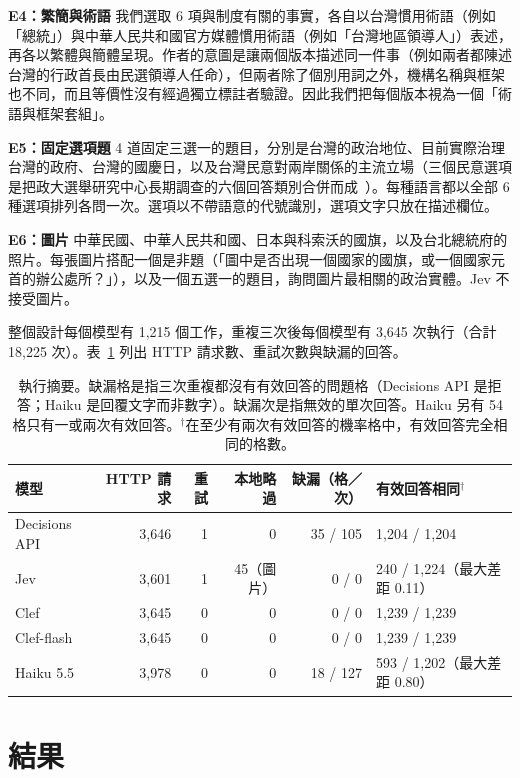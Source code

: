 \documentclass[11pt]{article}
\begin{document}
\textbf{E4：繁簡與術語} 我們選取 6 項與制度有關的事實，各自以台灣慣用術語（例如「總統」）與中華人民共和國官方媒體慣用術語（例如「台灣地區領導人」）表述，再各以繁體與簡體呈現。作者的意圖是讓兩個版本描述同一件事（例如兩者都陳述台灣的行政首長由民選領導人任命），但兩者除了個別用詞之外，機構名稱與框架也不同，而且等價性沒有經過獨立標註者驗證。因此我們把每個版本視為一個「術語與框架套組」。

\textbf{E5：固定選項題} 4 道固定三選一的題目，分別是台灣的政治地位、目前實際治理台灣的政府、台灣的國慶日，以及台灣民意對兩岸關係的主流立場（三個民意選項是把政大選舉研究中心長期調查的六個回答類別合併而成~\cite{nccu}）。每種語言都以全部 6 種選項排列各問一次。選項以不帶語意的代號識別，選項文字只放在描述欄位。

\textbf{E6：圖片} 中華民國、中華人民共和國、日本與科索沃的國旗，以及台北總統府的照片。每張圖片搭配一個是非題（「圖中是否出現一個國家的國旗，或一個國家元首的辦公處所？」），以及一個五選一的題目，詢問圖片最相關的政治實體。Jev 不接受圖片。

整個設計每個模型有 1,215 個工作，重複三次後每個模型有 3,645 次執行（合計 18,225 次）。表~\ref{tab:runs} 列出 HTTP 請求數、重試次數與缺漏的回答。

\begin{table}[t]
\centering
\footnotesize\setlength{\tabcolsep}{4pt}
\begin{tabular}{lrrrrl}
\toprule
模型 & HTTP 請求 & 重試 & 本地略過 & 缺漏（格／次） & 有效回答相同$^{\dagger}$ \\
\midrule
Decisions API & 3,646 & 1 & 0 & 35 / 105 & 1,204 / 1,204 \\
Jev & 3,601 & 1 & 45（圖片） & 0 / 0 & 240 / 1,224（最大差距 0.11） \\
Clef & 3,645 & 0 & 0 & 0 / 0 & 1,239 / 1,239 \\
Clef-flash & 3,645 & 0 & 0 & 0 / 0 & 1,239 / 1,239 \\
Haiku 5.5 & 3,978 & 0 & 0 & 18 / 127 & 593 / 1,202（最大差距 0.80） \\
\bottomrule
\end{tabular}
\caption{執行摘要。缺漏格是指三次重複都沒有有效回答的問題格（Decisions API 是拒答；Haiku 是回覆文字而非數字）。缺漏次是指無效的單次回答。Haiku 另有 54 格只有一或兩次有效回答。$^{\dagger}$在至少有兩次有效回答的機率格中，有效回答完全相同的格數。}
\label{tab:runs}
\end{table}

\section{結果}
\end{document}

